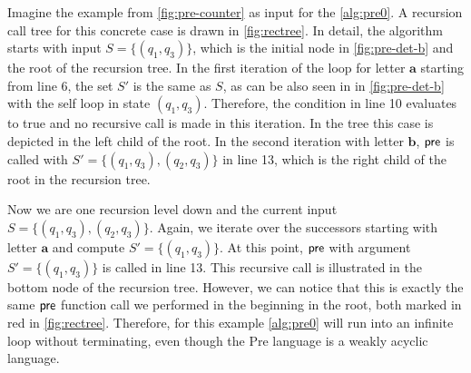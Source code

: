 %


Imagine the example from \autoref{fig:pre-counter} as input for the \autoref{alg:pre0}. A recursion call tree for this concrete case is drawn in \autoref{fig:rectree}.
In detail, the algorithm starts with input $S=\{(q_{1},q_{3})\}$, which is the initial node in \autoref{fig:pre-det-b} and the root of the recursion tree. In the first iteration of the loop for letter $\bm{a}$ starting from line 6, the set $S'$ is the same as $S$, as can be also seen in in \autoref{fig:pre-det-b} with the self loop in state $(q_{1},q_{3})$. Therefore, the condition in line 10 evaluates to true and no recursive call is made in this iteration. In the tree this case is depicted in the left child of the root. 
In the second iteration with letter $\bm{b}$, $\operatorname{\textsf{pre}}$ is called with $S'= \{(q_{1},q_{3}),(q_{2},q_{3})\}$ in line 13, which is the right child of the root in the recursion tree. 
\par
Now we are one recursion level down and the current input $S=\{(q_{1},q_{3}),(q_{2},q_{3})\}$. Again, we iterate over the successors starting with letter $\bm{a}$ and compute $S'=\{(q_{1},q_{3})\}$. At this point, $\operatorname{\textsf{pre}}$ with argument $S'=\{(q_{1},q_{3})\}$ is called in line 13. This recursive call is illustrated in the bottom node of the recursion tree. However, we can notice that this is exactly the same $\operatorname{\textsf{pre}}$ function call we performed in the beginning in the root, both marked in red in \autoref{fig:rectree}. Therefore, for this example \autoref{alg:pre0} will run into an infinite loop without terminating, even though the Pre language is a weakly acyclic language.


%


